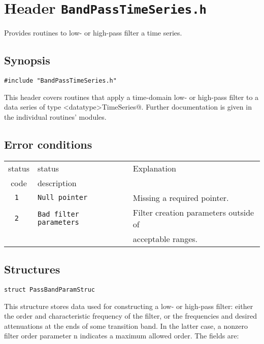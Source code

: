 
\section{Header \texttt{BandPassTimeSeries.h}}

Provides routines to low- or high-pass filter a time series.

\subsection{Synopsis}
\begin{verbatim}
#include "BandPassTimeSeries.h"
\end{verbatim}

\noindent This header covers routines that apply a time-domain low- or
high-pass filter to a data series of type \verb@<datatype>TimeSeries@.
Further documentation is given in the individual routines' modules.


\subsection{Error conditions}
\begin{tabular}{|c|l|l|}
\hline
status & status                    & Explanation                           \\
 code  & description               &                                       \\
\hline
\tt 1  & \tt Null pointer          & Missing a required pointer.           \\
\tt 2  & \tt Bad filter parameters & Filter creation parameters outside of \\
       &                           & acceptable ranges.                    \\
\hline
\end{tabular}


\subsection{Structures}

\begin{verbatim}
struct PassBandParamStruc
\end{verbatim}

\noindent This structure stores data used for constructing a low- or
high-pass filter: either the order and characteristic frequency of the
filter, or the frequencies and desired attenuations at the ends of
some transition band.  In the latter case, a nonzero filter order
parameter n indicates a maximum allowed order.  The fields are:

